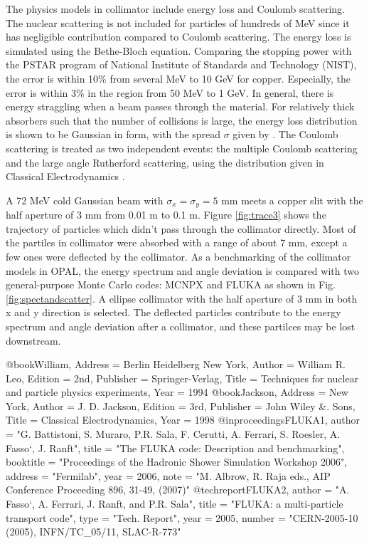The physics models in collimator include energy loss and Coulomb scattering. 
The nuclear scattering is not included for particles of hundreds of MeV since it has negligible contribution compared to Coulomb scattering. 
The energy loss is simulated using the Bethe-Bloch equation. 
Comparing the stopping power with the PSTAR program of National Institute of Standards and Technology (NIST),
the error is within 10\% from several MeV to 10 GeV for copper. Especially, the error is within 3\% in the region from 50 MeV to 1 GeV. 
In general, there is energy straggling when a beam passes through the material. 
For relatively thick absorbers such that the number of collisions is large, the energy loss distribution is shown to be Gaussian in form, with the spread $\sigma$ given by \cite{William}. 
The Coulomb scattering is treated as two independent events: the multiple Coulomb scattering and the large angle Rutherford scattering,
 using the distribution given in Classical Electrodynamics \cite{Jackson}.

A 72 MeV cold Gaussian beam with $\sigma_x=\sigma_y=5$ mm meets a copper slit with the half aperture of $3$ mm from 0.01 m to 0.1 m. 
Figure \ref{fig:trace3} shows the trajectory of particles which didn't pass through the collimator directly. 
Most of the partiles in collimator were absorbed with a range of about 7 mm, except a few ones were deflected by the collimator. 
As a benchmarking of the collimator models in OPAL, the energy spectrum and angle deviation is compared with two general-purpose Monte Carlo codes: 
MCNPX \cite{MCNPX} and FLUKA \cite{FLUKA1,FLUKA2} as shown in Fig. \ref{fig:spectandscatter}. 
A ellipse collimator with the half aperture of $3$ mm in both x and y direction is selected. 
The deflected particles contribute to the energy spectrum and angle deviation after a collimator, and these partilces may be lost downstream.



@book{William,
  Address =	 {Berlin Heidelberg New York},
  Author =	 {William R. Leo},
  Edition =	 {2nd},
  Publisher =	 {Springer-Verlag},
  Title =	 {Techniques for nuclear and particle physics experiments},
  Year =	 1994
}
@book{Jackson,
  Address =	 {New York},
  Author =	 {J. D. Jackson},
  Edition =	 {3rd},
  Publisher =	 {John Wiley &. Sons},
  Title =	 {Classical Electrodynamics},
  Year =	 1998
}
@inproceedings{FLUKA1,
  author =	 "G. Battistoni, S. Muraro, P.R. Sala, F. Cerutti, A. Ferrari,
S. Roesler, A. Fasso`, J. Ranft",
  title =	 "The FLUKA code: Description and benchmarking",
  booktitle =	 "Proceedings of the Hadronic Shower Simulation Workshop 2006",
  address =	 "Fermilab",
  year =	 2006,
  note =	 "M. Albrow, R. Raja eds., AIP Conference Proceeding 896, 31-49, (2007)"
}
@techreport{FLUKA2,
  author =	 "A. Fasso`, A. Ferrari, J. Ranft, and P.R. Sala",
  title =	 "FLUKA: a multi-particle transport code",
  type =	 "Tech. Report",
  year =	 2005,
  number =	 "CERN-2005-10 (2005), INFN/TC_05/11, SLAC-R-773"
}

